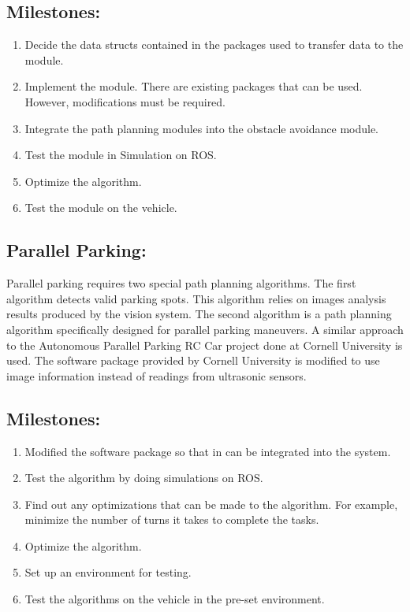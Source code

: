 \documentclass[compsoc,draftclsnofoot,onecolumn,10pt]{IEEEtran}
\begin{document}
\subsection{Milestones:}
\begin{enumerate}
	\item Decide the data structs contained in the packages used to transfer data to the module.
	\item Implement the module. There are existing packages that can be used. However, modifications must be required.
	\item Integrate the path planning modules into the obstacle avoidance module.
	\item Test the module in Simulation on ROS.
	\item Optimize the algorithm.
	\item Test the module on the vehicle.
\end{enumerate}

\subsection{Parallel Parking:}
Parallel parking requires two special path planning algorithms. The first algorithm detects valid parking spots. This algorithm relies on images analysis results produced by the vision system. The second algorithm is a path planning algorithm specifically designed for parallel parking maneuvers. A similar approach to the Autonomous Parallel Parking RC Car project done at Cornell University is used. The software package provided by Cornell University is modified to use image information instead of readings from ultrasonic sensors.\par
\subsection{Milestones:}
\begin{enumerate}
	\item Modified the software package so that in can be integrated into the system.
	\item Test the algorithm by doing simulations on ROS.
	\item Find out any optimizations that can be made to the algorithm. For example, minimize the number of turns it takes to complete the tasks.
	\item Optimize the algorithm.
	\item Set up an environment for testing.
	\item Test the algorithms on the vehicle in the pre-set environment.
\end{enumerate}
\end{document}
